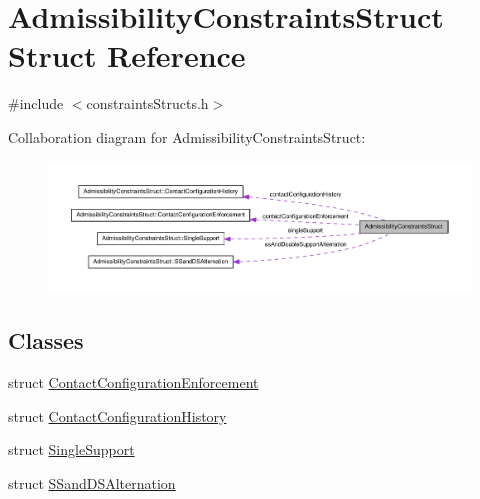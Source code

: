 \hypertarget{structAdmissibilityConstraintsStruct}{\section{\-Admissibility\-Constraints\-Struct \-Struct \-Reference}
\label{structAdmissibilityConstraintsStruct}
}


{\ttfamily \#include $<$constraints\-Structs.\-h$>$}



\-Collaboration diagram for \-Admissibility\-Constraints\-Struct\-:\nopagebreak
\begin{figure}[H]
\begin{center}
\leavevmode
\includegraphics[width=350pt]{structAdmissibilityConstraintsStruct__coll__graph}
\end{center}
\end{figure}
\subsection*{\-Classes}
\begin{DoxyCompactItemize}
\item 
struct \hyperlink{structAdmissibilityConstraintsStruct_1_1ContactConfigurationEnforcement}{\-Contact\-Configuration\-Enforcement}
\item 
struct \hyperlink{structAdmissibilityConstraintsStruct_1_1ContactConfigurationHistory}{\-Contact\-Configuration\-History}
\item 
struct \hyperlink{structAdmissibilityConstraintsStruct_1_1SingleSupport}{\-Single\-Support}
\item 
struct \hyperlink{structAdmissibilityConstraintsStruct_1_1SSandDSAlternation}{\-S\-Sand\-D\-S\-Alternation}
\end{DoxyCompactItemize}
